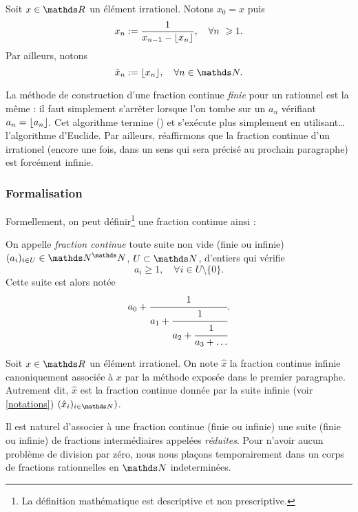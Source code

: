 \begin{notation}\label{notations}
	Soit $x\in \R$ un élément irrationel. Notons $x_0 = x$ puis \[x_n :=
	\frac{1}{x_{n-1} - \ent{x_n}}, \quad \forall n \geq 1.\] Par ailleurs,
	notons \[\hat{x}_n := \ent{x_n}, \quad \forall n\in \N.\]
\end{notation}

\begin{remarque}
	La méthode de construction d'une fraction continue \emph{finie} pour un
	rationnel est la même : il faut simplement s'arrêter lorsque l'on tombe sur
	un $a_n$ vérifiant $a_n = \lfloor a_n\rfloor$. Cet algorithme termine () et
	s'exécute plus simplement en utilisant… l'algorithme d'Euclide. Par
	ailleurs, réaffirmons que la fraction continue d'un irrationel (encore une
	fois, dans un sens qui sera précisé au prochain paragraphe) est forcément
	infinie.
\end{remarque}

\subsubsection{Formalisation}

Formellement, on peut définir\footnote{La définition mathématique est
descriptive et non prescriptive.} une fraction continue ainsi :

\begin{definition}\label{def-fracont}
	On appelle \emph{fraction continue} toute suite non vide (finie ou infinie)
	$(a_i)_{i\in U} \in \N^\N$, $U\subset \N$, d'entiers qui vérifie \[a_i
	\geq 1, \quad \forall i\in U\setminus\{0\}.\] Cette suite est alors notée
	\[a_0 + \cfrac{1}{a_1 + \cfrac{1}{a_2 + \cfrac{1}{a_3 + \dots}}}.\]
\end{definition}

\begin{notation}
	Soit $x\in \R$ un élément irrationel. On note $\hat{x}$ la fraction
	continue infinie canoniquement associée à $x$ par la méthode exposée dans
	le premier paragraphe. Autrement dit, $\hat{x}$ est la fraction continue
	donnée par la suite infinie (voir \ref{notations}) $(\hat{x}_i)_{i\in
	\N})$.
\end{notation}

Il est naturel d'associer à une fraction continue (finie ou infinie) une suite
(finie ou infinie) de fractions \og intermédiaires \fg{} appelées
\emph{réduites}. Pour n'avoir aucun problème de division par zéro, nous nous
plaçons temporairement dans un corps de fractions rationnelles en $\N$
indeterminées.

